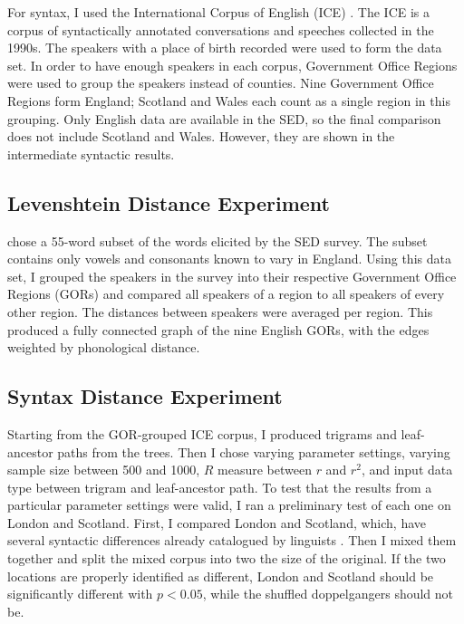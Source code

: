 \documentclass[11pt]{article}
\begin{document}
For syntax, I used the International Corpus of English (ICE)
\cite{nelson02}. The ICE is a corpus of syntactically annotated
conversations and speeches collected in the 1990s. The speakers with a
place of birth recorded were used to form the data set. In order to
have enough speakers in each corpus, Government Office Regions were
used to group the speakers instead of counties. Nine Government Office
Regions form England; Scotland and Wales each count as a single region
in this grouping. Only English data are available in the SED, so the
final comparison does not include Scotland and Wales. However, they
are shown in the intermediate syntactic results.

\subsection{Levenshtein Distance Experiment}

 chose a 55-word subset of the words elicited
by the SED survey. The subset contains only vowels and consonants
known to vary in England. Using this data set, I grouped the speakers
in the survey into their respective Government Office Regions (GORs)
and compared all speakers of a region to all speakers of every other
region. The distances between speakers were averaged per region.
This produced a fully connected graph of the nine
English GORs, with the edges weighted by phonological
distance.

\subsection{Syntax Distance Experiment}

Starting from the GOR-grouped ICE corpus, I produced trigrams and
leaf-ancestor paths from the trees. Then I chose varying parameter
settings, varying sample size between 500 and 1000, $R$ measure
between $r$ and $r^2$, and input data type between trigram and
leaf-ancestor path. To test that the results from a particular
parameter settings were valid, I ran a preliminary test of each one on
London and Scotland. First, I compared London and Scotland, which,
have several syntactic differences already catalogued by linguists
\cite{aitken79}.  Then I mixed them together and split the mixed
corpus into two the size of the original. If the two locations are
properly identified as different, London and Scotland should be
significantly different with $p < 0.05$, while the shuffled
doppelgangers should not be.
\end{document}
